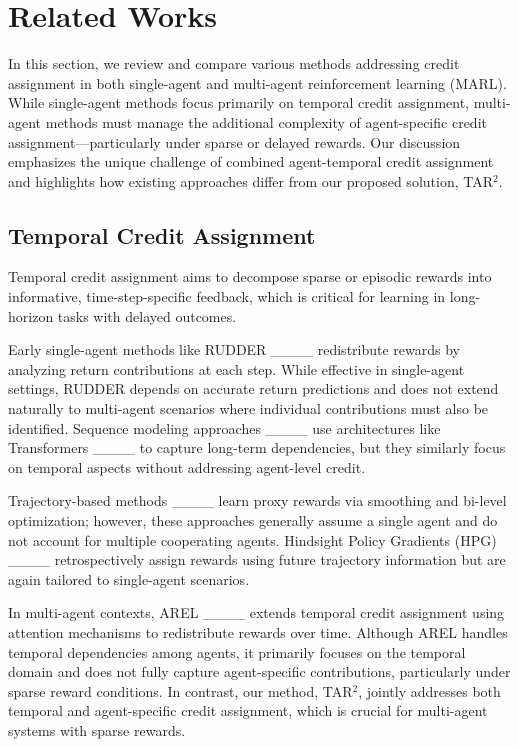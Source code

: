 \section{Related Works}
\label{sec:related-works}

In this section, we review and compare various methods addressing credit assignment in both single-agent and multi-agent reinforcement learning (MARL). While single-agent methods focus primarily on temporal credit assignment, multi-agent methods must manage the additional complexity of agent-specific credit assignment—particularly under sparse or delayed rewards. Our discussion emphasizes the unique challenge of combined agent-temporal credit assignment and highlights how existing approaches differ from our proposed solution, TAR\(^{2}\).

\subsection{Temporal Credit Assignment}
\label{subsec:temporal-credit-assignment}

Temporal credit assignment aims to decompose sparse or episodic rewards into informative, time-step-specific feedback, which is critical for learning in long-horizon tasks with delayed outcomes.

Early single-agent methods like RUDDER ____ redistribute rewards by analyzing return contributions at each step. While effective in single-agent settings, RUDDER depends on accurate return predictions and does not extend naturally to multi-agent scenarios where individual contributions must also be identified. Sequence modeling approaches ____ use architectures like Transformers ____ to capture long-term dependencies, but they similarly focus on temporal aspects without addressing agent-level credit.

Trajectory-based methods ____ learn proxy rewards via smoothing and bi-level optimization; however, these approaches generally assume a single agent and do not account for multiple cooperating agents. Hindsight Policy Gradients (HPG) ____ retrospectively assign rewards using future trajectory information but are again tailored to single-agent scenarios.

In multi-agent contexts, AREL ____ extends temporal credit assignment using attention mechanisms to redistribute rewards over time. Although AREL handles temporal dependencies among agents, it primarily focuses on the temporal domain and does not fully capture agent-specific contributions, particularly under sparse reward conditions. In contrast, our method, TAR\(^{2}\), jointly addresses both temporal and agent-specific credit assignment, which is crucial for multi-agent systems with sparse rewards.

